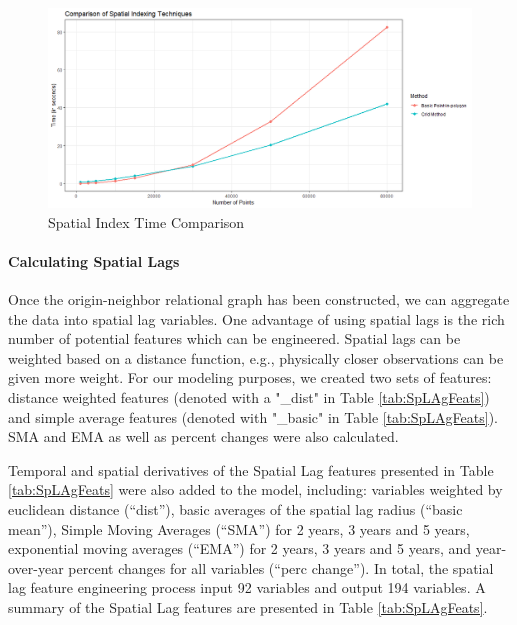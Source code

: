 \documentclass[12pt,]{article}
\let\oldparagraph\paragraph
\renewcommand{\paragraph}[1]{\oldparagraph{#1}\mbox{}}
\begin{document}
\begin{figure}[H]
\includegraphics[width=1\linewidth]{Sections/tables and figures/Example Spatial Indexing Techniques} \caption{Spatial Index Time Comparison}\label{fig:Spatial Indexing Process}
\end{figure}

\hypertarget{calculating-spatial-lags}{%
\paragraph{Calculating Spatial Lags}\label{calculating-spatial-lags}}

Once the origin-neighbor relational graph has been constructed, we can
aggregate the data into spatial lag variables. One advantage of using
spatial lags is the rich number of potential features which can be
engineered. Spatial lags can be weighted based on a distance function,
e.g., physically closer observations can be given more weight. For our
modeling purposes, we created two sets of features: distance weighted
features (denoted with a "\_dist" in Table \ref{tab:SpLAgFeats}) and
simple average features (denoted with "\_basic" in Table
\ref{tab:SpLAgFeats}). SMA and EMA as well as percent changes were also
calculated.

Temporal and spatial derivatives of the Spatial Lag features presented
in Table \ref{tab:SpLAgFeats} were also added to the model, including:
variables weighted by euclidean distance (``dist''), basic averages of
the spatial lag radius (``basic mean''), Simple Moving Averages
(``SMA'') for 2 years, 3 years and 5 years, exponential moving averages
(``EMA'') for 2 years, 3 years and 5 years, and year-over-year percent
changes for all variables (``perc change''). In total, the spatial lag
feature engineering process input 92 variables and output 194 variables.
A summary of the Spatial Lag features are presented in Table
\ref{tab:SpLAgFeats}.
\end{document}
